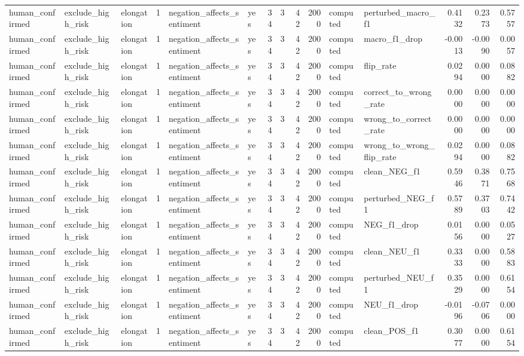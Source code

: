 \begin{tabular}{lllrllrrrrllrrr}
human_confirmed & exclude_high_risk & elongation & 1 & negation_affects_sentiment & yes & 34 & 3 & 42 & 2000 & computed & perturbed_macro_f1 & 0.4132 & 0.2373 & 0.5757 \\
human_confirmed & exclude_high_risk & elongation & 1 & negation_affects_sentiment & yes & 34 & 3 & 42 & 2000 & computed & macro_f1_drop & -0.0013 & -0.0090 & 0.0057 \\
human_confirmed & exclude_high_risk & elongation & 1 & negation_affects_sentiment & yes & 34 & 3 & 42 & 2000 & computed & flip_rate & 0.0294 & 0.0000 & 0.0882 \\
human_confirmed & exclude_high_risk & elongation & 1 & negation_affects_sentiment & yes & 34 & 3 & 42 & 2000 & computed & correct_to_wrong_rate & 0.0000 & 0.0000 & 0.0000 \\
human_confirmed & exclude_high_risk & elongation & 1 & negation_affects_sentiment & yes & 34 & 3 & 42 & 2000 & computed & wrong_to_correct_rate & 0.0000 & 0.0000 & 0.0000 \\
human_confirmed & exclude_high_risk & elongation & 1 & negation_affects_sentiment & yes & 34 & 3 & 42 & 2000 & computed & wrong_to_wrong_flip_rate & 0.0294 & 0.0000 & 0.0882 \\
human_confirmed & exclude_high_risk & elongation & 1 & negation_affects_sentiment & yes & 34 & 3 & 42 & 2000 & computed & clean_NEG_f1 & 0.5946 & 0.3871 & 0.7568 \\
human_confirmed & exclude_high_risk & elongation & 1 & negation_affects_sentiment & yes & 34 & 3 & 42 & 2000 & computed & perturbed_NEG_f1 & 0.5789 & 0.3703 & 0.7442 \\
human_confirmed & exclude_high_risk & elongation & 1 & negation_affects_sentiment & yes & 34 & 3 & 42 & 2000 & computed & NEG_f1_drop & 0.0156 & 0.0000 & 0.0527 \\
human_confirmed & exclude_high_risk & elongation & 1 & negation_affects_sentiment & yes & 34 & 3 & 42 & 2000 & computed & clean_NEU_f1 & 0.3333 & 0.0000 & 0.5883 \\
human_confirmed & exclude_high_risk & elongation & 1 & negation_affects_sentiment & yes & 34 & 3 & 42 & 2000 & computed & perturbed_NEU_f1 & 0.3529 & 0.0000 & 0.6154 \\
human_confirmed & exclude_high_risk & elongation & 1 & negation_affects_sentiment & yes & 34 & 3 & 42 & 2000 & computed & NEU_f1_drop & -0.0196 & -0.0706 & 0.0000 \\
human_confirmed & exclude_high_risk & elongation & 1 & negation_affects_sentiment & yes & 34 & 3 & 42 & 2000 & computed & clean_POS_f1 & 0.3077 & 0.0000 & 0.6154 \\

\end{tabular}
